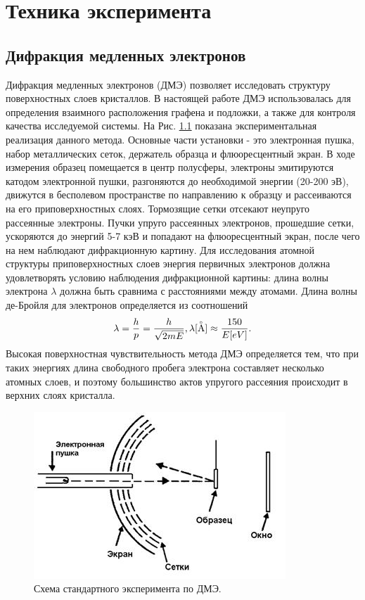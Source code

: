 \chapter{Техника эксперимента} \label{chapt_exp_tech}
\section{Дифракция медленных электронов} \label{leed}
Дифракция медленных электронов (ДМЭ) позволяет исследовать структуру поверхностных слоев кристаллов.  В настоящей работе ДМЭ использовалась для определения взаимного расположения графена и подложки, а также для контроля качества исследуемой системы. На Рис. \ref{img:leed_scheme} показана экспериментальная реализация данного метода. Основные части установки - это электронная пушка, набор металлических сеток, держатель образца и флюоресцентный экран. В ходе измерения образец помещается в центр полусферы, электроны эмитируются катодом электронной пушки, разгоняются до необходимой энергии (20-200 эВ), движутся в бесполевом пространстве по направлению к образцу и рассеиваются на его приповерхностных слоях. Тормозящие сетки отсекают неупруго рассеянные электроны. Пучки упруго рассеянных электронов, прошедшие сетки, ускоряются до энергий 5-7 кэВ и попадают на флюоресцентный экран, после чего на нем наблюдают дифракционную картину. 
Для исследования атомной структуры приповерхностных слоев энергия первичных электронов должна удовлетворять условию наблюдения дифракционной картины: длина волны электрона $\lambda$ должна быть сравнима с расстояниями между атомами. Длина волны де-Бройля для электронов определяется из соотношений
 	\begin{equation}
  \label{eq:equation1}
 \lambda=\frac{h}{p}=\frac{h}{\sqrt{2mE}}, \lambda[\buildrel _\circ \over {\mathrm{A}}]\approx\frac{150}{E[eV]}.
\end{equation}
Высокая поверхностная чувствительность метода ДМЭ определяется тем, что при таких энергиях длина свободного пробега электрона составляет несколько атомных слоев, и поэтому большинство актов упругого рассеяния происходит в верхних слоях кристалла.
 \begin{figure}[ht] 
  \center
  \includegraphics [scale=1] {./Dissertation/images/leed_scheme.jpg}
  \caption{Схема стандартного эксперимента по ДМЭ.} 
  \label{img:leed_scheme}  
\end{figure}
 

